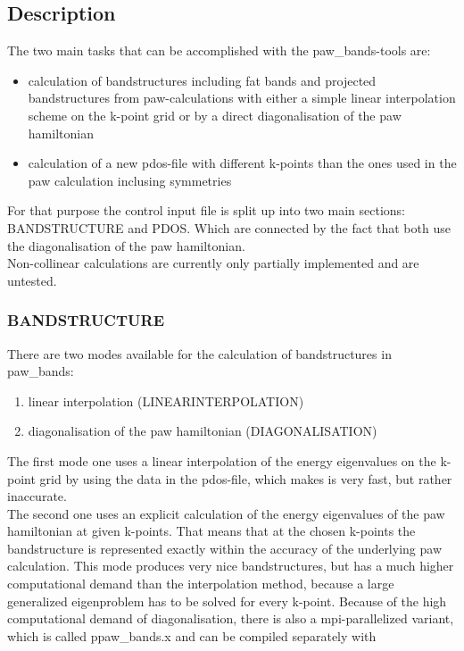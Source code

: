 \documentclass[final,12pt]{article}
\begin{document}
{{{{{{\subsection{Description}

The two main tasks that can be accomplished with the paw\_bands-tools are:
\begin{itemize} 
  \item calculation of bandstructures including fat bands and
      projected bandstructures from paw-calculations with either a simple linear
      interpolation scheme on the k-point grid or by a direct diagonalisation of
      the paw hamiltonian
  \item calculation of a new pdos-file with different k-points than 
    the ones used in the paw calculation inclusing symmetries
\end{itemize}

For that purpose the control input file is split up into two main sections:
BANDSTRUCTURE and PDOS. Which are connected by the fact that both use the
diagonalisation of the paw hamiltonian.\\ Non-collinear calculations are
currently only partially implemented and  are untested.

\subsubsection{BANDSTRUCTURE}
There are two modes available for the calculation of bandstructures in 
paw\_bands:
\begin{enumerate}
  \item linear interpolation (LINEARINTERPOLATION)
  \item diagonalisation of the paw hamiltonian (DIAGONALISATION)
\end{enumerate}
The first mode one uses a linear interpolation of the energy eigenvalues on the
k-point grid by using the data in the pdos-file, which makes is very fast, but
rather inaccurate. \\ The second one uses an explicit calculation of the energy
eigenvalues of the paw hamiltonian at given k-points. That means that at the
chosen k-points the bandstructure is represented exactly within the accuracy of
the underlying paw calculation. This mode produces very nice bandstructures, but
has a much higher computational demand than the interpolation method, because a
large generalized eigenproblem has to be solved for every k-point. Because of
the high computational demand of diagonalisation, there is also a
mpi-parallelized variant, which is called ppaw\_bands.x and can be compiled
separately with 

}}}}}}
\end{document}
